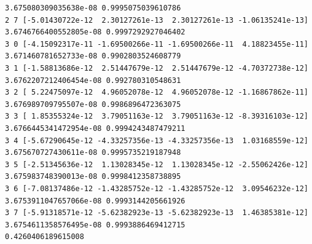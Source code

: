 \documentclass[11pt]{article}
\begin{document}
\begin{Verbatim}[commandchars=\\\{\}]
3.675080309035638e-08 0.9995075039610786
2 7 [-5.01430722e-12  2.30127261e-13  2.30127261e-13 -1.06135241e-13]
3.6746766400552805e-08 0.9997292927046402
3 0 [-4.15092317e-11 -1.69500266e-11 -1.69500266e-11  4.18823455e-11]
3.671460781652733e-08 0.9902803524608779
3 1 [-1.58813686e-12  2.51447679e-12  2.51447679e-12 -4.70372738e-12]
3.6762207212406454e-08 0.992780310548631
3 2 [ 5.22475097e-12  4.96052078e-12  4.96052078e-12 -1.16867862e-11]
3.676989709795507e-08 0.9986896472363075
3 3 [ 1.85355324e-12  3.79051163e-12  3.79051163e-12 -8.39316103e-12]
3.6766445341472954e-08 0.9994243487479211
3 4 [-5.67290645e-12 -4.33257356e-13 -4.33257356e-13  1.03168559e-12]
3.675670727430611e-08 0.9995735219187948
3 5 [-2.51345636e-12  1.13028345e-12  1.13028345e-12 -2.55062426e-12]
3.675983748390013e-08 0.9998412358738895
3 6 [-7.08137486e-12 -1.43285752e-12 -1.43285752e-12  3.09546232e-12]
3.6753911047657066e-08 0.9993144205661926
3 7 [-5.91318571e-12 -5.62382923e-13 -5.62382923e-13  1.46385381e-12]
3.6754611358576495e-08 0.9993886469412715
0.4260406189615008
    \end{Verbatim}
\end{document}
